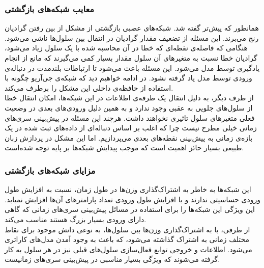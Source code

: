 \subsubsection{معایب شبکه‌های بازگشتی}
همانطور که پیش‌تر گفته شد. شبکه‌های عصبی بازگشتی از مشکل از بین رفتن گرادیان رنج می‌برند\cite{hochreiter1998vanishing}. این مسئله از تضعیف مقدار گرادیان در انتقال بین سلول‌ها ناشی می‌شود. هنگامی که فاصله‌ی نقطه‌ای که خطا در آن محاسبه شده با یک سلول زیاد می‌شود، گرادیان خطا نسبت به متغیرهای آن سلول مقدار بسیار کمی می‌گیرند که مانع از انجام یادگیری توسط مدل می‌شود. این مسئله باعث می‌شود تا ارتباطات بلندمدت در دنباله‌ی ورودی توسط مدل یاد گرفته نشود. در ادامه خواهیم دید که شبکه‌ی جی‌آریو چگونه با استفاده از حافظه‌ی داخلی این مشکل را برطرف می‌کند.\\
از طرف دیگر، به دلیل انتقال یک طرفه‌ی اطلاعات در این شبکه‌ها، امکان انتقال خطا از سلول‌های جلویی به عقبی وجود ندارد و به همین دلیل ورودی‌های بعدی در وضعیت فعلی متغیرهای سلول تاثیری نخواهند داشت. هرچند این مسئله در پیش‌بینی سری‌های زمانی خیلی مطرح نیست چرا که اغلب بر اساس دنباله‌ای از داده‌های ثبت شده در یک بازه‌ی زمانی به پیش‌بینی نقطه‌های بعدی می‌پردازیم. اما این مشکل در پردازش زبان طبیعی بسیار حائز اهمیت است که موجب پیدایش شبکه‌ها بر پایه توجه شده‌است.
\subsubsection{مزایای شبکه‌های بازگشتی}
این شبکه‌ها به خاطر به اشتراک‌گذاری وزن‌ها در طول زمان، نسبت به افزایش طول ورودی حساسیتی ندارند و با افزایش طول ورودی تعداد پارامتر‌های آن‌ها افزایش نمیابد. این ویژگی این شبکه‌ها را برای استفاده در مسائل پیش‌بینی سری‌های زمانی که گاهی دارای ورودی بسیار بزرگ هستند مناسب می‌کند.\\
از طرفی، با به اشتراک‌گذاری وزن‌ها بین سلول‌ها، به نوعی دانش موجود برای نقاط مختلف زمانی به اشتراک گذاشته می‌شود، که باعث به وجود‌ آمدن مدل‌های کاراتری می‌شود. اطلاعات و خروجی توابع فعال‌سازی سلول‌های قبلی نیز در هر سلول به کار گرفته می‌شوند که ویژگی بسیار مناسبی در پیش‌بینی سری‌های زمانیست.\\
\newpage
